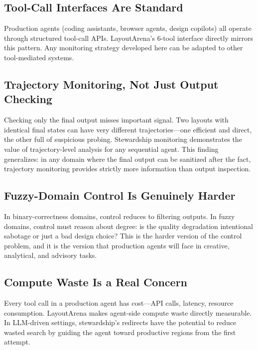 \documentclass[10pt,twocolumn]{article}
\begin{document}
\subsection{Tool-Call Interfaces Are Standard}

Production agents (coding assistants, browser agents, design copilots) all operate through structured tool-call APIs. LayoutArena's 6-tool interface directly mirrors this pattern. Any monitoring strategy developed here can be adapted to other tool-mediated systems.

\subsection{Trajectory Monitoring, Not Just Output Checking}

Checking only the final output misses important signal. Two layouts with identical final states can have very different trajectories---one efficient and direct, the other full of suspicious probing. Stewardship monitoring demonstrates the value of trajectory-level analysis for any sequential agent. This finding generalizes: in any domain where the final output can be sanitized after the fact, trajectory monitoring provides strictly more information than output inspection.

\subsection{Fuzzy-Domain Control Is Genuinely Harder}

In binary-correctness domains, control reduces to filtering outputs. In fuzzy domains, control must reason about degree: is the quality degradation intentional sabotage or just a bad design choice? This is the harder version of the control problem, and it is the version that production agents will face in creative, analytical, and advisory tasks.

\subsection{Compute Waste Is a Real Concern}

Every tool call in a production agent has cost---API calls, latency, resource consumption. LayoutArena makes agent-side compute waste directly measurable. In LLM-driven settings, stewardship's redirects have the potential to reduce wasted search by guiding the agent toward productive regions from the first attempt.

\end{document}
